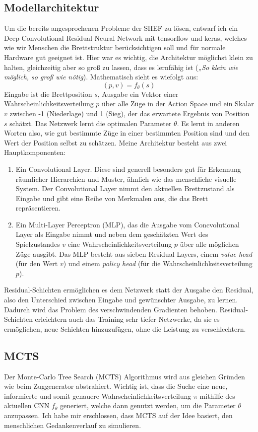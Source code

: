 \documentclass{jpp}
\begin{document}
\subsection{Modellarchitektur}
Um die bereits angesprochenen Probleme der SHEF zu lösen, entwarf ich ein Deep Convolutional Residual Neural Network mit tensorflow und keras, welches wie wir Menschen die Brettstruktur berücksichtigen soll und für normale Hardware gut geeignet ist. Hier war es wichtig, die Architektur möglichst klein zu halten, gleichzeitig aber so groß zu lassen, dass es lernfähig ist (\textit{„So klein wie möglich, so groß wie nötig}). Mathematisch sieht es wiefolgt aus:
\[(p, v) =  f_\theta(s)\]Eingabe ist die Brettposition $s$, Ausgabe ein Vektor einer Wahrscheinlichkeitsverteilung $p$ über alle Züge in der Action Space und ein Skalar $v$ zwischen -1 (Niederlage) und 1 (Sieg), der das erwartete Ergebnis von Position $s$ schätzt. Das Netzwerk lernt die optimalen Parameter $\theta$. Es lernt in anderen Worten also, wie gut bestimmte Züge in einer bestimmten Position sind und den Wert der Position selbst zu schätzen. 
Meine Architektur besteht aus zwei Hauptkomponenten:
\begin{enumerate}
\item Ein Convolutional Layer. Diese sind generell besonders gut für Erkennung räumlicher Hierarchien und Muster, ähnlich wie das menschliche visuelle System. Der Convolutional Layer nimmt den aktuellen Brettzustand als Eingabe und gibt eine Reihe von Merkmalen aus, die das Brett repräsentieren.
\item Ein Multi-Layer Perceptron (MLP), das die Ausgabe vom Concvolutional Layer als Eingabe nimmt und neben dem geschätzten Wert des Spielzustandes $v$ eine Wahrscheinlichkeitsverteilung $p$ über alle möglichen Züge ausgibt. Das MLP besteht aus sieben Residual Layers, einem \textit{value head} (für den Wert $v$) und einem \textit{policy head} (für die Wahrscheinlichkeitsverteilung $p$). 
\end{enumerate}
Residual-Schichten ermöglichen es dem Netzwerk statt der Ausgabe den Residual, also den Unterschied zwischen Eingabe und gewünschter Ausgabe, zu lernen. Dadurch wird das Problem des verschwindenden Gradienten behoben. Residual-Schichten erleichtern auch das Training sehr tiefer Netzwerke, da sie es ermöglichen, neue Schichten hinzuzufügen, ohne die Leistung zu verschlechtern. 

\subsection{MCTS}
Der Monte-Carlo Tree Search (MCTS) Algorithmus wird aus gleichen Gründen wie beim Zuggenerator abstrahiert. Wichtig ist, dass die Suche eine neue, informierte und somit genauere Wahrscheinlichkeitsverteilung $\pi$ mithilfe des aktuellen CNN $f_\theta$ generiert, welche dann genutzt werden, um die Parameter $\theta$ anzupassen. Ich habe mir erschlossen, dass MCTS auf der Idee basiert, den menschlichen Gedankenverlauf zu simulieren.
\end{document}
